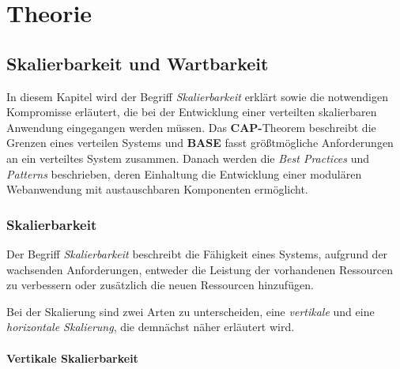 \chapter{Theorie}
\section{Skalierbarkeit und Wartbarkeit}

In diesem Kapitel wird der Begriff \textit{Skalierbarkeit} erklärt sowie die notwendigen Kompromisse erläutert, die bei der Entwicklung einer verteilten skalierbaren Anwendung eingegangen werden müssen. Das \textbf{CAP-}Theorem beschreibt die Grenzen eines verteilen Systems und \textbf{BASE} fasst größtmögliche Anforderungen an ein verteiltes System zusammen. Danach werden die \textit{Best Practices} und \textit{Patterns} beschrieben, deren Einhaltung die Entwicklung einer modulären Webanwendung mit austauschbaren Komponenten ermöglicht. 

\subsection{Skalierbarkeit}\label{scale}
Der Begriff \textit{Skalierbarkeit} beschreibt die Fähigkeit eines Systems, aufgrund der wachsenden Anforderungen, entweder die Leistung der vorhandenen Ressourcen zu verbessern oder zusätzlich die neuen Ressourcen hinzufügen. %

Bei der Skalierung sind zwei Arten zu unterscheiden, eine \textit{vertikale} und eine \textit{horizontale Skalierung}, die demnächst näher erläutert wird.

\subsubsection{Vertikale Skalierbarkeit}

